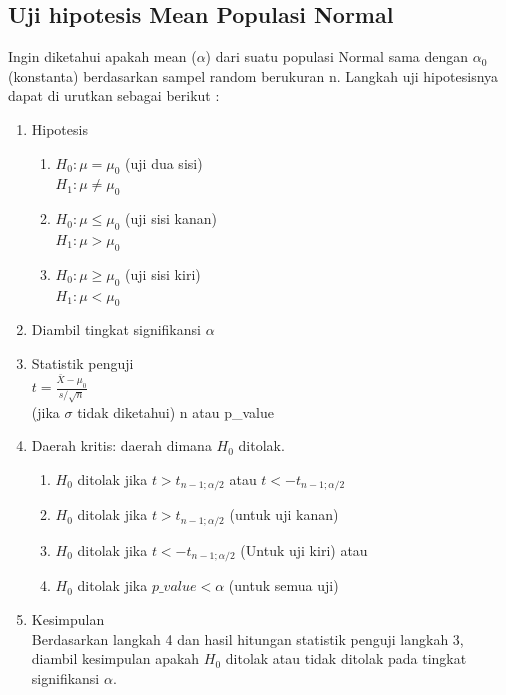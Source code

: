 \documentclass[a4paper,12pt]{article}
\begin{document}
\subsection{Uji hipotesis Mean Populasi Normal}
Ingin diketahui apakah mean ($\alpha$) dari suatu populasi Normal sama dengan $\alpha_{0} $(konstanta) berdasarkan sampel random berukuran n. Langkah uji hipotesisnya dapat di urutkan sebagai berikut :\\
\begin{enumerate}
    \item Hipotesis
        \begin{enumerate}
            \item $H_{0} : \mu = \mu_{0}$ (uji dua sisi)\\
                $H_{1} : \mu \neq \mu_{0}$

            \item $H_{0} : \mu \leq \mu_{0}$ (uji sisi kanan)\\
                $H_{1} : \mu > \mu_{0}$

            \item $H_{0} : \mu \geq \mu_{0}$ (uji sisi kiri)\\
                $H_{1} : \mu < \mu_{0}$

        \end{enumerate}

    \item Diambil tingkat signifikansi $\alpha$

    \item Statistik penguji\\
        \begin{math}
            t = \frac{\bar{X} - \mu_{0}} {s/\sqrt{n}}
        \end{math}\\
        (jika $\sigma$ tidak diketahui) n atau p\_value

    \item Daerah kritis: daerah dimana $H_{0}$ ditolak.
        \begin{enumerate}
            \item $H_{0}$ ditolak jika $t > t_{n - 1;\alpha/2}$ atau $t < - t_{n-1;\alpha/2}$
            \item $H_{0}$ ditolak jika $t > t_{n - 1;\alpha/2}$ (untuk uji kanan) 
            \item $H_{0}$ ditolak jika $t < - t_{n-1;\alpha/2}$ (Untuk uji kiri) atau
            \item $H_{0}$ ditolak jika $p\_value < \alpha$ (untuk semua uji)
        \end{enumerate}
        
    \item Kesimpulan\\
        Berdasarkan langkah 4 dan hasil hitungan statistik penguji langkah 3, diambil kesimpulan apakah $H_{0}$ ditolak atau tidak ditolak pada tingkat signifikansi $\alpha$.
\end{enumerate}
\end{document}
